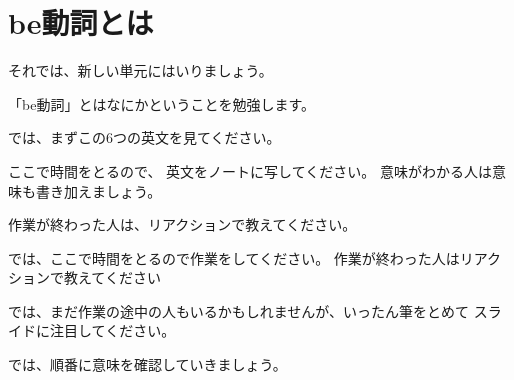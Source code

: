 \documentclass[book,jafontscale=0.9247]{jlreq}
\newcommand{\mySagyo}{%
\par%
\bigskip
では、ここで時間をとるので作業をしてください。
作業が終わった人はリアクションで教えてください\par%
\begin{minipage}[t]{.98\textwidth}
\mbox{}\hrulefill\mbox{}\par%
\mbox{}\hfill{}\raisebox{-.5\height}{作業}\hfill\mbox{}\par%
\mbox{}\hrulefill\mbox{}
\end{minipage}%
\par%
\bigskip%
では、まだ作業の途中の人もいるかもしれませんが、いったん筆をとめて
スライドに注目してください。%
\par%
\bigskip
}
\begin{document}
%
%
%
%
%
%
%

%
%
%
%
%
%
%


\section{be動詞とは}
それでは、新しい単元にはいりましょう。

「be動詞」とはなにかということを勉強します。

{\large \ComputerMouse}

では、まずこの6つの英文を見てください。

ここで時間をとるので、
英文をノートに写してください。
意味がわかる人は意味も書き加えましょう。

作業が終わった人は、リアクションで教えてください。

\mySagyo

では、順番に意味を確認していきましょう。
\end{document}
